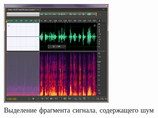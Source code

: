 \documentclass[oneside, final, 14pt]{extreport}
\begin{document}
\begin{figure}[h]
\centering
\includegraphics[width=0.5\textwidth]{pic-noisereduction-01}
\caption{Выделение фрагмента сигнала, содержащего шум}
\label{pic-noisereduction-01}
\end{figure}
\end{document}
